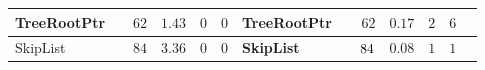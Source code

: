 \documentclass{beamer}
\newcommand{\hcol}[1]{yellow!20!orange!20}
\newcommand{\ucol}[1]{red!50}
\newcommand{\scol}[1]{blue!40}
\begin{document}
\begin{frame}
\begin{center}
\begin{adjustbox}{max height=\textheight, max width=\textwidth}
\begin{tabular}{| l | l | r | r | r | r || l | l | r | r | r | r | r |}
		\hline
		TreeRootPtr & \cellcolor{\scol{}} \safe & $62$ &  $1.43$  & $0$  &  $0$ & \cellcolor{\hcol{}}\textbf{TreeRootPtr} & \cellcolor{\ucol{}}\unsafe & \cellcolor{\hcol{}} $62$ & \cellcolor{\hcol{}} $0.17$  & \cellcolor{\hcol{}} $2$ & \cellcolor{\hcol{}} $6$\\
        \hline
		SkipList    & \cellcolor{\scol{}} \safe & $84$ & $3.36$  & $0$  & $0$ & \cellcolor{\hcol{}}\textbf{SkipList} & \cellcolor{\ucol{}}\unsafe & $\cellcolor{\hcol{}} 84$ & \cellcolor{\hcol{}} $0.08$  & \cellcolor{\hcol{}} $1$  & \cellcolor{\hcol{}} $1$ \\
        \hline
	\end{tabular}
	\label{tab:times}
	\end{adjustbox}	
	\end{center}

\end{frame}
\end{document}

